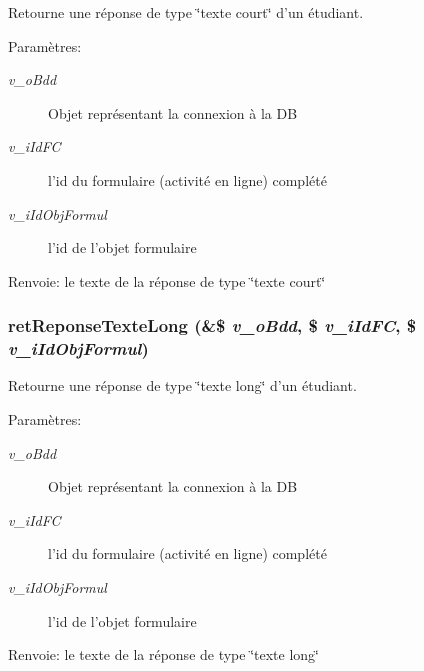 Retourne une réponse de type \char`\"{}texte court\char`\"{} d'un étudiant. 

\begin{Desc}
\item[Paramètres:]
\begin{description}
\item[{\em v\_\-oBdd}]Objet représentant la connexion à la DB \item[{\em v\_\-iIdFC}]l'id du formulaire (activité en ligne) complété \item[{\em v\_\-iIdObjFormul}]l'id de l'objet formulaire\end{description}
\end{Desc}
\begin{Desc}
\item[Renvoie:]le texte de la réponse de type \char`\"{}texte court\char`\"{} \end{Desc}
\subsubsection{\setlength{\rightskip}{0pt plus 5cm}retReponseTexteLong (\&\$ {\em v\_\-oBdd}, \/  \$ {\em v\_\-iIdFC}, \/  \$ {\em v\_\-iIdObjFormul})}\label{fonctions__form_8inc_8php_a3f685e4409a939ff7f0cdbc327048bb}


Retourne une réponse de type \char`\"{}texte long\char`\"{} d'un étudiant. 

\begin{Desc}
\item[Paramètres:]
\begin{description}
\item[{\em v\_\-oBdd}]Objet représentant la connexion à la DB \item[{\em v\_\-iIdFC}]l'id du formulaire (activité en ligne) complété \item[{\em v\_\-iIdObjFormul}]l'id de l'objet formulaire\end{description}
\end{Desc}
\begin{Desc}
\item[Renvoie:]le texte de la réponse de type \char`\"{}texte long\char`\"{} \end{Desc}
